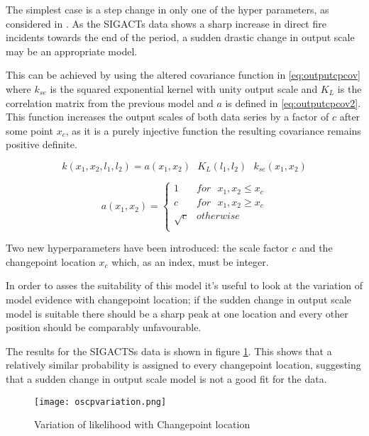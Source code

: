 \documentclass[a4paper,11pt]{report}
\begin{document}
The simplest case is a step change in only one of the hyper parameters, as considered in \cite{changepoint-prediction}. As the SIGACTs data shows a sharp increase in direct fire incidents towards the end of the period, a sudden drastic change in output scale may be an appropriate model.

This can be achieved by using the altered covariance function in \ref{eq:outputcpcov} where \(k_{se}\) is the squared exponential kernel with unity output scale and \(K_L\) is the correlation matrix from the previous model and \(a\) is defined in \ref{eq:outputcpcov2}. This function increases the output scales of both data series by a factor of \(c\) after some point \(x_c\), as it is a purely injective function the resulting covariance remains positive definite. 

\singlespacing
\begin{equation} \label{eq:outputcpcov}
k(x_1,x_2,l_1,l_2) = a(x_1,x_2)\text{ } K_L(l_1,l_2) \text{ }k_{se}(x_1,x_2)
\end{equation}

\begin{equation} \label{eq:outputcpcov2}
a(x_1,x_2) = \begin{cases}
1 & for \text{ } x_1, x_2 \leq x_c \\
c & for \text{ } x_1, x_2 \geq x_c \\ 
\sqrt{c} & otherwise \\ 
\end{cases}
\end{equation}
\doublespacing

Two new hyperparameters have been introduced: the scale factor \(c\) and the changepoint location \(x_c\) which, as an index, must be integer. 

In order to asses the suitability of this model it's useful to look at the variation of model evidence with changepoint location; if the sudden change in output scale model is suitable there should be a sharp peak at one location and every other position should be comparably unfavourable. 

The results for the SIGACTSs data is shown in figure \ref{fig:oscpvariation}. This shows that a relatively similar probability is assigned to every changepoint location, suggesting that a sudden change in output scale model is not a good fit for the data. 

\begin{figure}
\centering
\texttt{[image: oscpvariation.png]}
\caption{Variation of likelihood with Changepoint location}
\label{fig:oscpvariation}
\end{figure}
\end{document}
